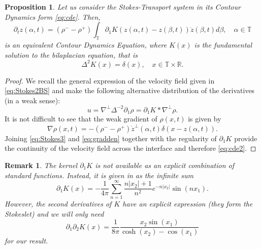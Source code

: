 \documentclass[11pt]{article}
\numberwithin{equation}{section}
\newtheorem{prop}[thm]{Proposition}
\newtheorem{rmk}[thm]{Remark}
\newcommand{\p}{\partial}
\begin{document}
\begin{prop}
    Let us consider the Stokes-Transport system in its Contour Dynamics form \eqref{eq:cde}. Then,  
    \begin{equation} \label{eq:cde2}
        \partial_t z(\alpha,t) = (\rho^--\rho^+) \int_\mathbb{T} \partial_1 K(z(\alpha,t)-z(\beta,t))  \dot z(\beta,t) d\beta, \quad \alpha \in \mathbb{T}
    \end{equation}
    is an equivalent Contour Dynamics Equation, where $K(x)$ is the fundamental solution to the bilaplacian equation, that is 
    $$ \Delta^2 K(x) = \delta(x), \quad x \in \mathbb{T} \times \mathbb{R}.$$
\end{prop}
\begin{proof}
    We recall the general expression of the velocity field given in \eqref{eq:Stokes2BS} and make the following alternative distribution of the derivatives (in a weak sense):
    \begin{equation} 
    \label{eq:Stokes3}
         u = \nabla^\perp \Delta^{-2}\p_1 \rho = \p_1 K \ast \nabla^\perp \rho.
    \end{equation}
    It is not difficult to see that the weak gradient of $\rho(x,t)$ is given by
    \begin{equation} \label{eq:gradden}
        \nabla \rho(x,t) = - (\rho^--\rho^+)  \dot z^\perp(\alpha,t)\delta (x-z(\alpha,t)).
    \end{equation}
    Joining \eqref{eq:Stokes3} and \eqref{eq:gradden} together with the regularity of $\partial_1K$ provide the continuity of the velocity field across the interface and therefore \eqref{eq:cde2}.
\end{proof}

\begin{rmk}
    The kernel $\p_1 K$ is not available as an explicit combination of standard functions. Instead, it is given in \cite{GGS25_SIMA} as the infinite sum 
    \begin{equation*}
        \partial_1 K(x) = -\frac{1}{4\pi} \sum_{n= 1}^\infty  \frac{n|x_2|+1}{n^2} e^{-n|x_2|} \sin(nx_1).
    \end{equation*}
    However, the second derivatives of $K$ have an explicit expression (they form the Stokeslet) and we will only need 
    \begin{equation*}
        \p_1 \p_2 K(x) = \frac{1}{8\pi}\frac{x_2 \sin(x_1)}{\cosh(x_2)-\cos(x_1)}
    \end{equation*}
    for our result.
\end{rmk}
\end{document}
